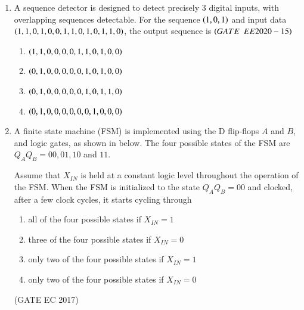 \begin{enumerate}[label=\arabic*.,ref=\theenumi]
\begin{enumerate}
\end{enumerate}

\item A sequence detector is designed to detect precisely $3$ digital inputs, with overlapping sequences detectable. For the sequence $\left(1,0,1\right)$ and input data $\left(1,1,0,1,0,0,1,1,0,1,0,1,1,0\right)$, the output sequence is
$\hfill\brak{GATE\enspace EE2020-15}$
   \begin{enumerate}
  \item  $\left(1,1,0,0,0,0,1,1,0,1,0,0\right)$
  \item $\left(0,1,0,0,0,0,0,1,0,1,0,0\right)$
  \item $\left(0,1,0,0,0,0,0,1,0,1,1,0\right)$
  \item $\left(0,1,0,0,0,0,0,0,1,0,0,0\right)$

\end{enumerate}

\item A finite state machine (FSM) is implemented using the D flip-flops $A$ and $B$, and logic gates, as shown in  
	below. The four possible states of the FSM are $Q_AQ_B = 00, 01, 10$ and	 $11$.  
%
\begin{figure}[H]
\centering
\resizebox{\columnwidth}{!}{%
	
}%
	\caption{}
\label{fig:ide/fsm/figs/circuit}
\end{figure}
Assume that $X_{IN}$ is held at a constant logic level throughout the operation of the FSM. When the FSM is initialized to the state $Q_AQ_B = 00$ and clocked, after a few clock cycles, it starts cycling through
\begin{enumerate}
\item all of the four possible states if $X_{IN} = 1$
\item three of the four possible states if $X_{IN} = 0$
\item only two of the four possible states if $X_{IN} = 1$
\item only two of the four possible states if $X_{IN} = 0$
\end{enumerate}
\hfill{(GATE EC 2017)}

\end{enumerate}
